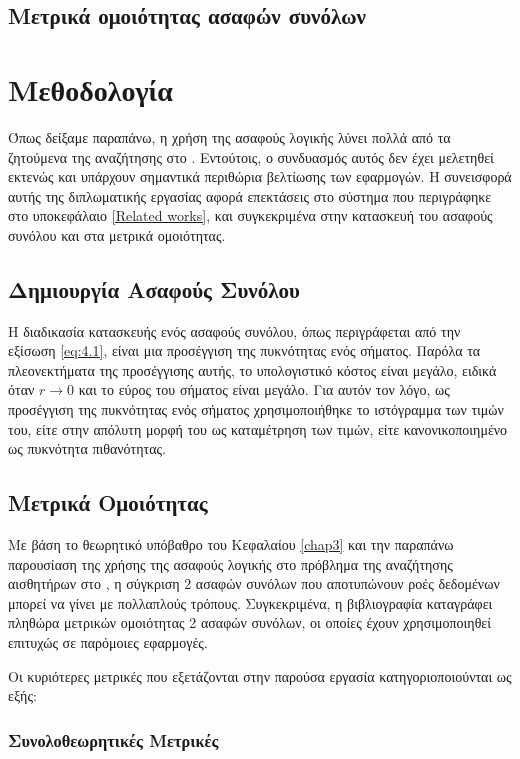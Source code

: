 \subsection{Μετρικά ομοιότητας ασαφών συνόλων}

\section{Μεθοδολογία}
Όπως δείξαμε παραπάνω, η χρήση της ασαφούς λογικής λύνει πολλά από τα ζητούμενα της αναζήτησης στο .
Εντούτοις, ο συνδυασμός αυτός δεν έχει μελετηθεί εκτενώς και υπάρχουν σημαντικά περιθώρια βελτίωσης των εφαρμογών.
Η συνεισφορά αυτής της διπλωματικής εργασίας αφορά επεκτάσεις στο σύστημα που περιγράφηκε στο υποκεφάλαιο \ref{Related works}, και συγκεκριμένα στην κατασκευή του ασαφούς συνόλου και στα μετρικά ομοιότητας.

\subsection{Δημιουργία Ασαφούς Συνόλου}

Η διαδικασία κατασκευής ενός ασαφούς συνόλου, όπως περιγράφεται από την εξίσωση \ref{eq:4.1}, είναι μια προσέγγιση της πυκνότητας ενός σήματος.
Παρόλα τα πλεονεκτήματα της προσέγγισης αυτής, το υπολογιστικό κόστος είναι μεγάλο, ειδικά όταν \(r \rightarrow 0\) και το εύρος του σήματος είναι μεγάλο.
Για αυτόν τον λόγο, ως προσέγγιση της πυκνότητας ενός σήματος χρησιμοποιήθηκε το ιστόγραμμα των τιμών του, είτε στην απόλυτη μορφή του ως καταμέτρηση των τιμών, είτε κανονικοποιημένο ως πυκνότητα πιθανότητας. 

\subsection{Μετρικά Ομοιότητας}
Με βάση το θεωρητικό υπόβαθρο του Κεφαλαίου \ref{chap3} και την παραπάνω παρουσίαση της χρήσης της ασαφούς λογικής στο πρόβλημα της αναζήτησης αισθητήρων στο , η σύγκριση 2 ασαφών συνόλων που αποτυπώνουν ροές δεδομένων μπορεί να γίνει με πολλαπλούς τρόπους.
Συγκεκριμένα, η βιβλιογραφία καταγράφει πληθώρα μετρικών ομοιότητας 2 ασαφών συνόλων, οι οποίες έχουν χρησιμοποιηθεί επιτυχώς σε παρόμοιες εφαρμογές.
\par
Οι κυριότερες μετρικές που εξετάζονται στην παρούσα εργασία κατηγοριοποιούνται ως εξής:

\subsubsection{Συνολοθεωρητικές Μετρικές}

